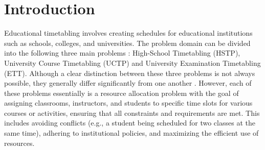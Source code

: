 \documentclass[sigconf]{acmart}
\begin{document}


\maketitle



\section{Introduction}
Educational timetabling involves creating schedules for educational
institutions such as schools, colleges, and universities.
The problem domain can be divided into the following three main problems
\cite{kingston2013educational,schaerf1999survey}:
High-School Timetabling (HSTP), University Course Timetabling (UCTP) and
University Examination Timetabling (ETT).
Although a clear distinction between these three problems is not always
possible, they generally differ significantly from one another
\cite{Beligiannis2009}.
However, each of these problems essentially is a resource allocation problem
with the goal of assigning classrooms, instructors, and students to specific
time slots for various courses or activities, ensuring that all constraints and
requirements are met.
This includes avoiding conflicts (e.g., a student being scheduled for two
classes at the same time), adhering to institutional policies, and maximizing
the efficient use of resources.
\end{document}
